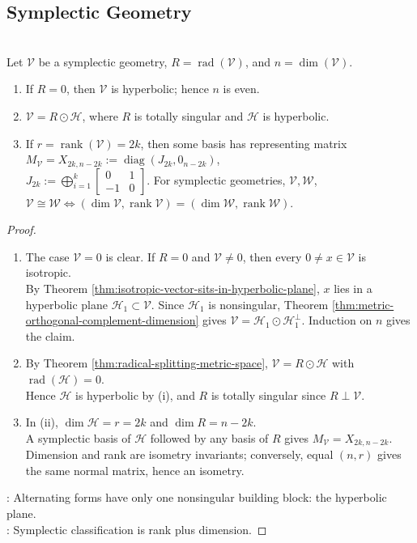 \subsection{Symplectic Geometry}

\begin{theorem} \label{thm:symplectic-geometries-hyperbolic-classification} \\
Let $\mathcal{V}$ be a symplectic geometry, $R=\operatorname{rad}(\mathcal{V})$, and $n=\dim(\mathcal{V})$.
\begin{enumerate}[label=(\roman*)]
\setlength{\itemsep}{0pt}
\item If $R=0$, then $\mathcal{V}$ is hyperbolic; hence $n$ is even.
\item $\mathcal{V}=R\odot\mathcal{H}$, where $R$ is totally singular and $\mathcal{H}$ is hyperbolic.
\item If $r=\operatorname{rank}(\mathcal{V})=2k$, then some basis has representing matrix $M_{\mathcal{V}}=X_{2k,n-2k}:=\operatorname{diag}(J_{2k},0_{n-2k})$,\\
$J_{2k}:=\bigoplus\limits_{i=1}^{k}
\begin{bmatrix}
0 & 1\\
-1 & 0
\end{bmatrix}$. For symplectic geometries, $\mathcal{V},\mathcal{W}$, $\mathcal{V}\cong\mathcal{W}\iff(\dim\mathcal{V},\operatorname{rank}\mathcal{V})=(\dim\mathcal{W},\operatorname{rank}\mathcal{W})$.
\end{enumerate}
\begin{proof}
\begin{enumerate}[label=(\roman*)]
\setlength{\itemsep}{0pt}
\item The case $\mathcal{V}=0$ is clear. If $R=0$ and $\mathcal{V}\neq0$, then every $0\neq x\in\mathcal{V}$ is isotropic.\\
By Theorem \ref{thm:isotropic-vector-sits-in-hyperbolic-plane}, $x$ lies in a hyperbolic plane $\mathcal{H}_1\subset\mathcal{V}$. Since $\mathcal{H}_1$ is nonsingular, Theorem \ref{thm:metric-orthogonal-complement-dimension} gives $\mathcal{V}=\mathcal{H}_1\odot\mathcal{H}_1^{\perp}$. Induction on $n$ gives the claim.
\item By Theorem \ref{thm:radical-splitting-metric-space}, $\mathcal{V}=R\odot\mathcal{H}$ with $\operatorname{rad}(\mathcal{H})=0$.\\
Hence $\mathcal{H}$ is hyperbolic by (i), and $R$ is totally singular since $R\perp\mathcal{V}$.
\item In (ii), $\dim\mathcal{H}=r=2k$ and $\dim R=n-2k$.\\
A symplectic basis of $\mathcal{H}$ followed by any basis of $R$ gives $M_{\mathcal{V}}=X_{2k,n-2k}$. Dimension and rank are isometry invariants; conversely, equal $(n,r)$ gives the same normal matrix, hence an isometry.
\end{enumerate}
: Alternating forms have only one nonsingular building block: the hyperbolic plane.\\
: Symplectic classification is rank plus dimension.
\end{proof}
\end{theorem}

